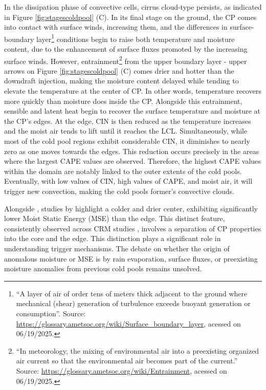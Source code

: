In the dissipation phase of convective cells, cirrus cloud-type persists, as indicated in Figure \ref{fig:stagescoldpool} (C). In its final stage on the ground, the CP comes into contact with surface winds, increasing them, and the differences in surface-boundary layer\footnote{``A layer of air of order tens of meters thick adjacent to the ground where mechanical (shear) generation of turbulence exceeds buoyant generation or consumption''. Source: \url{https://glossary.ametsoc.org/wiki/Surface\_boundary\_layer}, acessed on 06/19/2025.} conditions begin to raise both temperature and moisture content, due to the enhancement of surface fluxes promoted by the increasing surface winds. However, entrainment\footnote{``In meteorology, the mixing of environmental air into a preexisting organized air current so that the environmental air becomes part of the current.'' Source: \url{https://glossary.ametsoc.org/wiki/Entrainment}, acessed on 06/19/2025.} from the upper boundary layer - upper arrows on Figure \ref{fig:stagescoldpool} (C) comes drier and hotter than the downdraft injection, making the moisture content delayed while tending to elevate the temperature at the center of CP. In other words, temperature recovers more quickly than moisture does inside the CP. Alongside this entrainment, sensible and latent heat begin to recover the surface temperature and moisture at the CP's edges. At the edge, CIN is then reduced as the temperature increases and the moist air tends to lift until it reaches the LCL. Simultaneously, while most of the cold pool regions exhibit considerable CIN, it diminishes to nearly zero as one moves towards the edges. This reduction occurs precisely in the areas where the largest CAPE values are observed. Therefore, the highest CAPE values within the domain are notably linked to the outer extents of the cold pools. Eventually, with low values of CIN, high values of CAPE, and moist air, it will trigger new convection, making the cold pools former's convective clouds.

Alongside , studies by  highlight a colder and drier center, exhibiting significantly lower Moist Static Energy (MSE) than the edge. This distinct feature, consistently observed across CRM studies \cite{langhans2015origin, torri2015mechanisms, fuglestvedt2020cold}, involves a separation of CP properties into the core and the edge. This distinction plays a significant role in understanding trigger mechanisms. The debate on whether the origin of anomalous moisture or MSE is by rain evaporation, surface fluxes, or preexisting moisture anomalies from previous cold pools remains unsolved.


